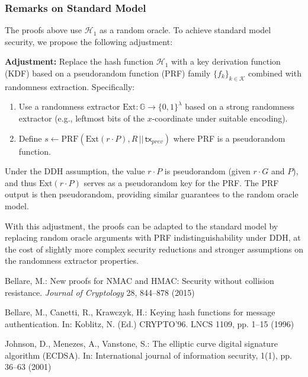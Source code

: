 \documentclass{article}
\begin{document}
\subsubsection{Remarks on Standard Model}

The proofs above use $\mathcal{H}_1$ as a random oracle. To achieve standard model security, we propose the following adjustment:

\textbf{Adjustment:} Replace the hash function $\mathcal{H}_1$ with a key derivation function (KDF) based on a pseudorandom function (PRF) family $\{f_k\}_{k \in \mathcal{K}}$ combined with randomness extraction. Specifically:
\begin{enumerate}
\item Use a randomness extractor $\text{Ext} \colon \mathbb{G} \to \{0,1\}^\lambda$ based on a strong randomness extractor (e.g., leftmost bits of the $x$-coordinate under suitable encoding).
\item Define $s \leftarrow \text{PRF}(\text{Ext}(r \cdot P), R \,||\, \mathsf{tx}_{prev})$ where PRF is a pseudorandom function.
\end{enumerate}

Under the DDH assumption, the value $r \cdot P$ is pseudorandom (given $r \cdot G$ and $P$), and thus $\text{Ext}(r \cdot P)$ serves as a pseudorandom key for the PRF. The PRF output is then pseudorandom, providing similar guarantees to the random oracle model.

With this adjustment, the proofs can be adapted to the standard model by replacing random oracle arguments with PRF indistinguishability under DDH, at the cost of slightly more complex security reductions and stronger assumptions on the randomness extractor properties.





\begin{thebibliography}{99}
 Bellare, M.: New proofs for NMAC and HMAC: Security without collision resistance.  \emph{Journal of Cryptology} 28, 844--878 (2015)

Bellare, M., Canetti, R., Krawczyk, H.: Keying hash functions for message authentication.
In: Koblitz, N. (Ed.) CRYPTO’96. LNCS 1109, pp. 1--15 (1996)

Johnson, D., Menezes, A., Vanstone, S.: The elliptic curve digital signature algorithm (ECDSA). In: International journal of information security, 1(1), pp. 36--63 (2001)

\end{thebibliography}
\end{document}
